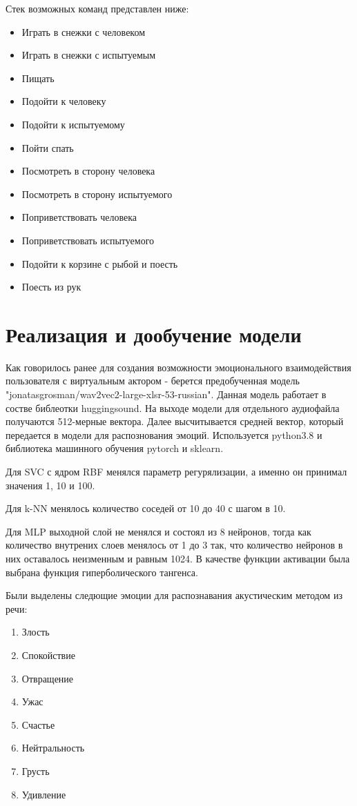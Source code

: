 Стек возможных команд представлен ниже:

\begin{itemize}
  \item Играть в снежки с человеком 
  \item Играть в снежки с испытуемым
  \item Пищать
  \item Подойти к человеку
  \item Подойти к испытуемому
  \item Пойти спать
  \item Посмотреть в сторону человека
  \item Посмотреть в сторону испытуемого
  \item Поприветствовать человека
  \item Поприветствовать испытуемого
  \item Подойти к корзине с рыбой и поесть
  \item Поесть из рук
\end{itemize}




\section{Реализация и дообучение модели}

Как говорилось ранее для создания возможности эмоционального взаимодействия пользователя с виртуальным актором - 
берется предобученная модель "jonatasgrosman/wav2vec2-large-xlsr-53-russian". Данная модель 
работает в состве библеотки huggingsound. На выходе модели для отдельного аудиофайла получаются 512-мерные вектора. 
Далее высчитывается средней вектор, который передается в модели для распознования эмоций.
Используется python3.8 и библиотека машинного обучения pytorch и sklearn.

Для SVC с ядром RBF менялся параметр регурялизации, а именно он принимал значения 1, 10 и 100.

Для k-NN менялось количество соседей от 10 до 40 с шагом в 10.

Для MLP выходной слой не менялся и состоял из 8 нейронов, тогда как количество внутрених слоев менялось от 1 до 3 так,
что количество нейронов в них оставалось неизменным и равным 1024.
В качестве функции активации была выбрана функция гиперболического тангенса.

Были выделены следющие эмоции для распознавания акустическим методом из речи:

\begin{enumerate}
  \item Злость
  \item Спокойствие
  \item Отвращение
  \item Ужас
  \item Счастье
  \item Нейтральность
  \item Грусть
  \item Удивление
\end{enumerate}

